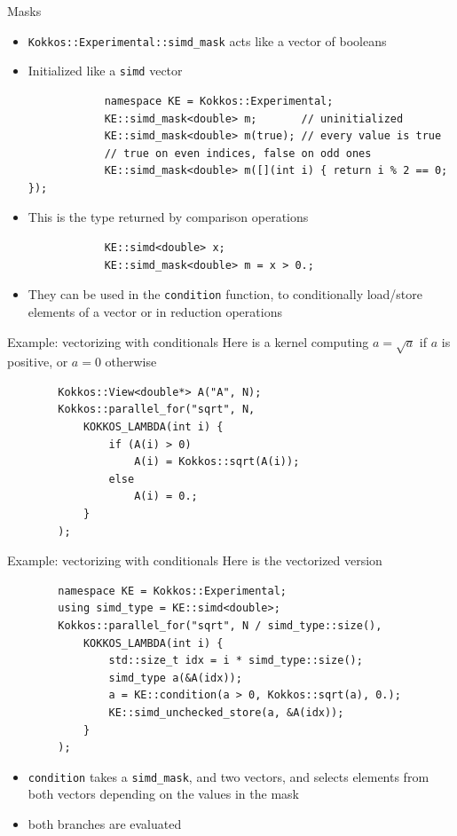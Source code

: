 \documentclass[
    aspectratio=169,
    \createHandout
]{beamer}
\begin{document}
\begin{frame}[fragile]{Masks}
    \begin{itemize}
        \item \texttt{Kokkos::Experimental::simd\_mask} acts like a vector of booleans
        \item Initialized like a \texttt{simd} vector
        \begin{verbatim}
            namespace KE = Kokkos::Experimental;
            KE::simd_mask<double> m;       // uninitialized
            KE::simd_mask<double> m(true); // every value is true
            // true on even indices, false on odd ones
            KE::simd_mask<double> m([](int i) { return i % 2 == 0; });
        \end{verbatim}
        \item This is the type returned by comparison operations
        \begin{verbatim}
            KE::simd<double> x;
            KE::simd_mask<double> m = x > 0.;
        \end{verbatim}
        \item They can be used in the \texttt{condition} function, to conditionally load/store elements of a vector or in reduction operations
    \end{itemize}
\end{frame}

\begin{frame}[fragile]{Example: vectorizing with conditionals}
    Here is a kernel computing $a = \sqrt{a}$ if $a$ is positive, or $a = 0$ otherwise
    \begin{verbatim}
        Kokkos::View<double*> A("A", N);
        Kokkos::parallel_for("sqrt", N,
            KOKKOS_LAMBDA(int i) {
                if (A(i) > 0)
                    A(i) = Kokkos::sqrt(A(i));
                else
                    A(i) = 0.;
            }
        );
    \end{verbatim}
\end{frame}

\begin{frame}[fragile]{Example: vectorizing with conditionals}
    Here is the vectorized version
    \begin{verbatim}
        namespace KE = Kokkos::Experimental;
        using simd_type = KE::simd<double>;
        Kokkos::parallel_for("sqrt", N / simd_type::size(),
            KOKKOS_LAMBDA(int i) {
                std::size_t idx = i * simd_type::size();
                simd_type a(&A(idx));
                a = KE::condition(a > 0, Kokkos::sqrt(a), 0.);
                KE::simd_unchecked_store(a, &A(idx));
            }
        );
    \end{verbatim}
    \vspace{-15pt}
    \begin{itemize}
        \item \texttt{condition} takes a \texttt{simd\_mask}, and two vectors, and selects elements from both vectors depending on the values in the mask
        \item {} both branches are evaluated
    \end{itemize}
\end{frame}
\end{document}
